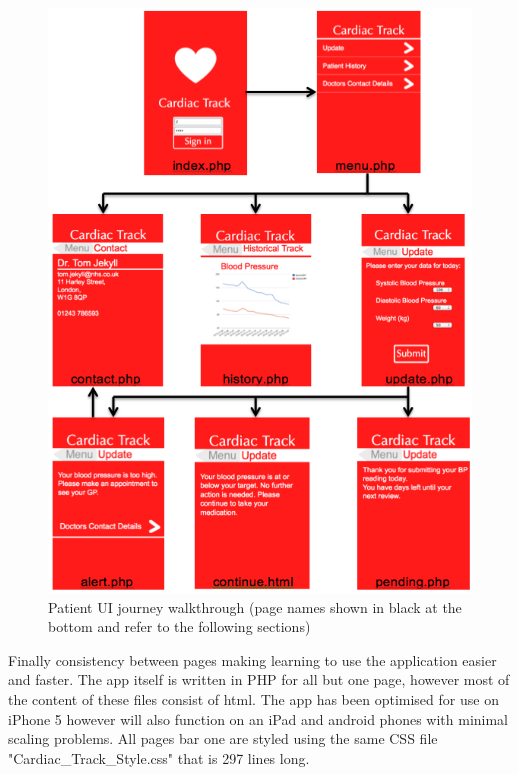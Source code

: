 \documentclass[11pt]{article}
\begin{document}
\begin{figure}
\centering
\includegraphics[width=1\linewidth]{patientUI.png}
\caption{Patient UI journey walkthrough (page names shown in black at the bottom and refer to the following sections) \label{patientUI}}
\end{figure} 
Finally consistency between pages making learning to use the application easier and faster. The app itself is written in PHP for all but one page, however most of the content of these files consist of html. The app has been optimised for use on iPhone 5 however will also function on an iPad and android phones with minimal scaling problems. All pages bar one are styled using the same CSS file "Cardiac\_Track\_Style.css" that is 297 lines long. 
\end{document}
